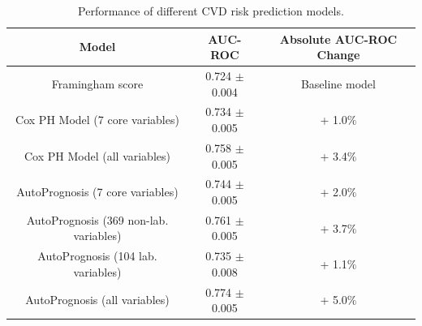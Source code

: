 \documentclass [PhD] {uclathes}
\begin{document}
\begin{table}[t]
\centering
\begin{tabular}{|c|c|c|}
\hline
{\bf \footnotesize Model} & {\bf \footnotesize AUC-ROC} & {\bf \footnotesize Absolute AUC-ROC Change}  \\ \hline
{\footnotesize Framingham score} & {\footnotesize 0.724 $\pm$ 0.004} & {\footnotesize Baseline model}  \\ \hline 
{\footnotesize Cox PH Model (7 core variables)} & {\footnotesize 0.734 $\pm$ 0.005} & {\footnotesize + 1.0$\%$}  \\ \hline 
{\footnotesize Cox PH Model (all variables)} & {\footnotesize 0.758 $\pm$ 0.005} & {\footnotesize + 3.4$\%$} \\ \hline\hline
{\footnotesize AutoPrognosis (7 core variables)} & {\footnotesize 0.744 $\pm$ 0.005} & {\footnotesize + 2.0$\%$}   \\ \hline
{\footnotesize AutoPrognosis (369 non-lab. variables)} & {\footnotesize 0.761 $\pm$ 0.005} & {\footnotesize + 3.7$\%$}    \\ \hline
{\footnotesize AutoPrognosis (104 lab. variables)} & {\footnotesize 0.735 $\pm$ 0.008} & {\footnotesize + 1.1$\%$}  \\ \hline
{\footnotesize AutoPrognosis (all variables)} & {\footnotesize 0.774 $\pm$ 0.005} & {\footnotesize + 5.0$\%$} \\ \hline
\end{tabular}
\caption{Performance of different CVD risk prediction models.}
\label{ch7Table1}
\end{table}
\end{document}
